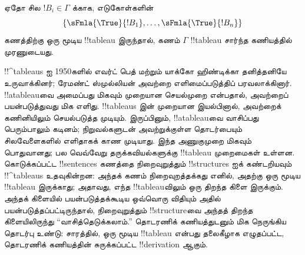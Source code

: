 \documentclass[../../../include/open-logic-section]{subfiles}
\begin{document}
ஏதோ சில $!B_i \in \Gamma$ க்காக, எடுகோள்களின்
\[
\{\sFmla{\True}{!B_1}, \dots, \sFmla{\True}{!B_n}\}
\]
கணத்திற்கு ஒரு மூடிய !!{tableau} இருந்தால், கணம் $\Gamma$ !!{tableau}
சார்ந்த கணியத்தில் முரணுடையது.

!!^{tableau}s ஐ 1950களில் எவர்ட் பெத் மற்றும் யாக்கோ ஹிண்டிக்கா தனித்தனியே
உருவாக்கினர்; ரேமண்ட் ஸ்முல்லியன் அவற்றை எளிமைப்படுத்திப் பரவலாக்கினார்.
!!a{tableau}வை அமைப்பது மிகவும் முறையான செயல்முறை என்பதால், அவற்றைப்
பயன்படுத்துவது மிக எளிது. !!{tableau}s இன் முறையான இயல்பினால், அவற்றைக்
கணினியிலும் செயல்படுத்த முடியும். இருப்பினும், !!a{tableau}வை வாசிப்பது
பெரும்பாலும் கடினம்; நிறுவல்களுடன் அவற்றுக்குள்ள தொடர்பையும் சிலவேளைகளில்
எளிதாகக் காண முடியாது. இந்த அணுகுமுறை மிகவும் பொதுவானது; பல வெவ்வேறு
தருக்கவியல்களுக்கு !!{tableau} முறைமைகள் உள்ளன. கொடுக்கப்பட்ட !!{sentence}s
கணத்தை நிறைவுறுத்தும் !!{structure}s ஐக் கண்டறியவும் !!^{tableau}s
உதவுகின்றன: அந்தக் கணம் நிறைவுறத்தக்கது எனில், அதற்கு ஒரு மூடிய
!!{tableau} இருக்காது; அதாவது, எந்த !!{tableau}விலும் ஒரு திறந்த கிளை
இருக்கும். அந்தக் கிளையில் பயன்படுத்தக்கூடிய ஒவ்வொரு விதியும் அதில்
பயன்படுத்தப்பட்டிருந்தால், நிறைவுறுத்தும் !!{structure}வை அந்தத் திறந்த
கிளையிலிருந்து ``வாசித்தெடுக்கலாம்.'' தொடரணிக் கணியத்துடனும் மிக நெருங்கிய
தொடர்பு உண்டு: சாரத்தில், ஒரு மூடிய !!{tableau} என்பது தலைகீழாக எழுதப்பட்ட,
தொடரணிக் கணியத்தின் சுருக்கப்பட்ட !!{derivation} ஆகும்.
\end{document}
